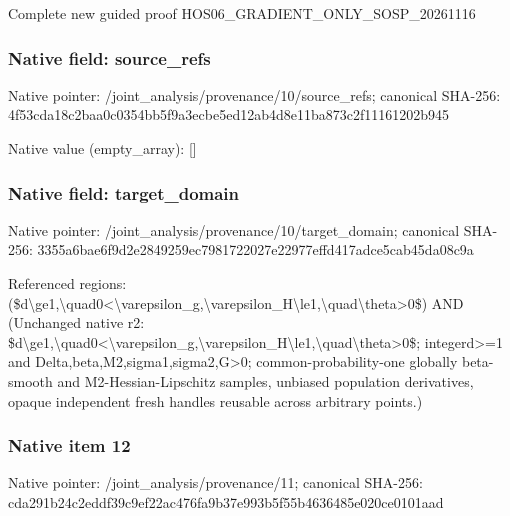 \documentclass[10pt,a4paper]{article}
\begin{document}
\begingroup\raggedright\sloppy Complete new guided proof HOS06\_\allowbreak{}GRADIENT\_\allowbreak{}ONLY\_\allowbreak{}SOSP\_\allowbreak{}20261116\par\endgroup

\subsubsection{Native field: source\_\allowbreak{}refs}
Native pointer: /joint\_\allowbreak{}analysis/provenance/10/source\_\allowbreak{}refs; canonical SHA-256: 4f53cda18c2baa0c0354bb5f9a3ecbe5ed12ab4d8e11ba873c2f11161202b945

Native value (empty\_\allowbreak{}array): []

\subsubsection{Native field: target\_\allowbreak{}domain}
Native pointer: /joint\_\allowbreak{}analysis/provenance/10/target\_\allowbreak{}domain; canonical SHA-256: 3355a6bae6f9d2e2849259ec7981722027e22977effd417adce5cab45da08c9a

\begingroup\raggedright\sloppy Referenced regions:\allowbreak{} (\$d\textbackslash{}ge1,\allowbreak{}\textbackslash{}quad0<\textbackslash{}varepsilon\_\allowbreak{}g,\allowbreak{}\textbackslash{}varepsilon\_\allowbreak{}H\textbackslash{}le1,\allowbreak{}\textbackslash{}quad\textbackslash{}theta>0\$) AND (Unchanged native r2:\allowbreak{} \$d\textbackslash{}ge1,\allowbreak{}\textbackslash{}quad0<\textbackslash{}varepsilon\_\allowbreak{}g,\allowbreak{}\textbackslash{}varepsilon\_\allowbreak{}H\textbackslash{}le1,\allowbreak{}\textbackslash{}quad\textbackslash{}theta>0\$;\allowbreak{} integerd>=\allowbreak{}1 and Delta,\allowbreak{}beta,\allowbreak{}M2,\allowbreak{}sigma1,\allowbreak{}sigma2,\allowbreak{}G>0;\allowbreak{} common-probability-one globally beta-smooth and M2-Hessian-Lipschitz samples,\allowbreak{} unbiased population derivatives,\allowbreak{} opaque independent fresh handles reusable across arbitrary points.)\par\endgroup

\subsubsection{Native item 12}
Native pointer: /joint\_\allowbreak{}analysis/provenance/11; canonical SHA-256: cda291b24c2eddf39c9ef22ac476fa9b37e993b5f55b4636485e020ce0101aad
\end{document}
